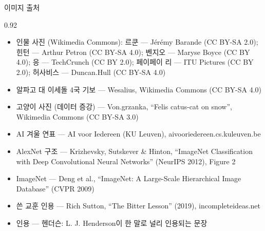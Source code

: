 \documentclass[aspectratio=169,11pt,t]{beamer}
\begin{document}
\begin{frame}{이미지 출처}
\begin{center}\begin{varwidth}{0.92\textwidth}
  \scriptsize
  \begin{itemize}
    \item 인물 사진 (Wikimedia Commons): 르쿤 --- Jérémy Barande (CC BY-SA 2.0); 힌턴 --- Arthur Petron (CC BY-SA 4.0);
      벤지오 --- Maryse Boyce (CC BY 4.0); 응 --- TechCrunch (CC BY 2.0); 페이페이 리 --- ITU Pictures (CC BY 2.0); 허사비스 --- Duncan.Hull (CC BY-SA 4.0)
    \item 알파고 대 이세돌 4국 기보 --- Wesalius, Wikimedia Commons (CC BY-SA 4.0)
    \item 고양이 사진 (데이터 증강) --- Von.grzanka, ``Felis catus-cat on snow'', Wikimedia Commons (CC BY-SA 3.0)
    \item AI 겨울 연표 --- AI voor Iedereen (KU Leuven), aivooriedereen.cs.kuleuven.be
    \item AlexNet 구조 --- Krizhevsky, Sutskever \& Hinton, ``ImageNet Classification with Deep Convolutional Neural Networks'' (NeurIPS 2012), Figure 2
    \item ImageNet --- Deng et al., ``ImageNet: A Large-Scale Hierarchical Image Database'' (CVPR 2009)
    \item 쓴 교훈 인용 --- Rich Sutton, ``The Bitter Lesson'' (2019), incompleteideas.net
    \item 인용 --- 헨더슨: L. J. Henderson이 한 말로 널리 인용되는 문장
  \end{itemize}
\end{varwidth}\end{center}
\end{frame}
\end{document}
